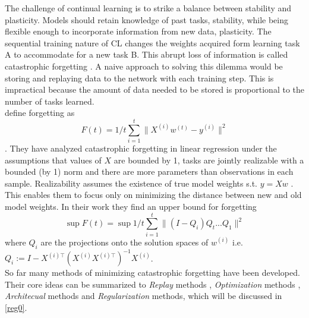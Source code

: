 The challenge of continual learning is to strike a balance between stability and plasticity. Models should retain knowledge of past tasks, stability, while being flexible enough to incorporate information from new data, plasticity. The sequential training nature of CL changes the weights acquired form learning task A to accommodate for a new task B. This abrupt loss of information is called catastrophic forgetting \cite{FRENCH1999128, Mcclelland1995, MCCLOSKEY1989109, Ratcliff1990ConnectionistMO}. A naive approach to solving this dilemma would be storing and replaying data to the network with each training step. This is impractical because the amount of data needed to be stored is proportional to the number of tasks learned.\\
\citeauthor{evron2022} define forgetting as
\begin{equation}
	F(t) = 1/t \sum_{i=1}^{t}\lVert X^{(i)} w^{(t)} - y^{(i)} \rVert^2
\end{equation}.
They have analyzed catastrophic forgetting in linear regression under the assumptions that values of $X$ are bounded by 1, tasks are jointly realizable with a bounded (by 1) norm and there are more parameters than observations in each sample. Realizability assumes the existence of true model weights s.t. $y =Xw$ \cite{Shalev-Shwartz}. This enables them to focus only on minimizing the distance between new and old model weights. In their work they find an upper bound for forgetting
\begin{equation}
	\sup F(t) = \sup 1/t \sum_{i=1}^{t}\lVert(I-Q_i)Q_t ... Q_1\rVert^2
\end{equation}
where $Q_i$ are the projections onto the solution spaces of $w^{(i)}$ i.e. $Q_i := I - X^{(i)\top}(X^{(i)} X^{(i)\top})^{-1} X^{(i)}$.\\
So far many methods of minimizing catastrophic forgetting have been developed. Their core ideas can be summarized to \textit{Replay} methods \cite{chaudhry2019,rebuffi2017icarlincrementalclassifierrepresentation, aljundi2019gradientbasedsampleselection}, \textit{Optimization} methods \cite{lopezpaz2022gradientepisodicmemorycontinual, javed2019metalearningrepresentationscontinuallearning, mirzadeh2020understandingroletrainingregimes}, \textit{Architecual} methods \cite{mallya2018piggybackadaptingsinglenetwork, ebrahimi2020adversarialcontinuallearning, fernando2017pathnetevolutionchannelsgradient} and \textit{Regularization} methods, which will be discussed in \autoref{reg0}.
